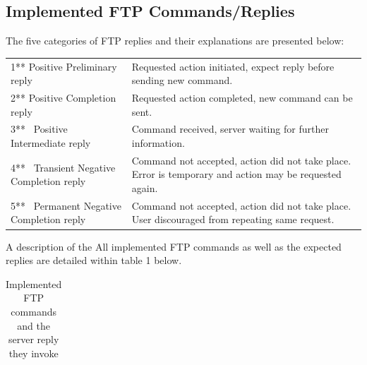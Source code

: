 \documentclass[10pt,twocolumn]{witseiepaper}
\begin{document}
\begin{appendix}
	
\setcounter{figure}{0} \renewcommand{\thefigure}{A\arabic{figure}}
	
\section{Implemented FTP Commands/Replies} \label{sec:comm-replyTable}
\setcounter{table}{0} \renewcommand{\thefigure}{A\arabic{table}}

The five categories of FTP replies and their explanations are presented below:

\begin{tabular}{ll}
	1** Positive Preliminary reply & \multicolumn{1}{p{10.5cm}}{\raggedright Requested action initiated, expect reply before sending new command.}\\
	2** Positive Completion reply & Requested action completed, new command can be sent.\\
	3**~ Positive Intermediate reply& Command received, server waiting for further information. \\
	4**~ Transient Negative Completion reply& \multicolumn{1}{p{10.5cm}}{\raggedright Command not accepted, action did not take place. Error is temporary and action may be requested again.}\\
	5**~ Permanent Negative Completion reply & \multicolumn{1}{p{10.5cm}}{\raggedright Command not accepted, action did not take place. User discouraged from repeating same request. }\\
\end{tabular}

A description of the All implemented FTP commands as well as the expected replies are detailed within table 1 below.

\begin{table}[h]
	\label{commandTable}
	\caption{Implemented FTP commands and the server reply they invoke}

\begin{tabular}{|l|l|l|}
	

\end{tabular}
\end{table}
\end{appendix}
\end{document}
